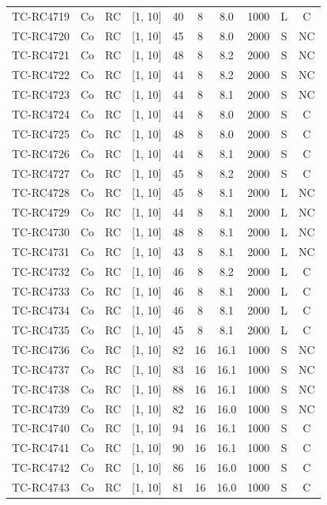 \begin{longtable}{lccccccccc}
TC-RC4719 & Co & RC & [1, 10] & 40 & 8 & 8.0 & 1000 & L & C \\
TC-RC4720 & Co & RC & [1, 10] & 45 & 8 & 8.0 & 2000 & S & NC \\
TC-RC4721 & Co & RC & [1, 10] & 48 & 8 & 8.2 & 2000 & S & NC \\
TC-RC4722 & Co & RC & [1, 10] & 44 & 8 & 8.2 & 2000 & S & NC \\
TC-RC4723 & Co & RC & [1, 10] & 44 & 8 & 8.1 & 2000 & S & NC \\
TC-RC4724 & Co & RC & [1, 10] & 44 & 8 & 8.0 & 2000 & S & C \\
TC-RC4725 & Co & RC & [1, 10] & 48 & 8 & 8.0 & 2000 & S & C \\
TC-RC4726 & Co & RC & [1, 10] & 44 & 8 & 8.1 & 2000 & S & C \\
TC-RC4727 & Co & RC & [1, 10] & 45 & 8 & 8.2 & 2000 & S & C \\
TC-RC4728 & Co & RC & [1, 10] & 45 & 8 & 8.1 & 2000 & L & NC \\
TC-RC4729 & Co & RC & [1, 10] & 44 & 8 & 8.1 & 2000 & L & NC \\
TC-RC4730 & Co & RC & [1, 10] & 48 & 8 & 8.1 & 2000 & L & NC \\
TC-RC4731 & Co & RC & [1, 10] & 43 & 8 & 8.1 & 2000 & L & NC \\
TC-RC4732 & Co & RC & [1, 10] & 46 & 8 & 8.2 & 2000 & L & C \\
TC-RC4733 & Co & RC & [1, 10] & 46 & 8 & 8.1 & 2000 & L & C \\
TC-RC4734 & Co & RC & [1, 10] & 46 & 8 & 8.1 & 2000 & L & C \\
TC-RC4735 & Co & RC & [1, 10] & 45 & 8 & 8.1 & 2000 & L & C \\
TC-RC4736 & Co & RC & [1, 10] & 82 & 16 & 16.1 & 1000 & S & NC \\
TC-RC4737 & Co & RC & [1, 10] & 83 & 16 & 16.1 & 1000 & S & NC \\
TC-RC4738 & Co & RC & [1, 10] & 88 & 16 & 16.1 & 1000 & S & NC \\
TC-RC4739 & Co & RC & [1, 10] & 82 & 16 & 16.0 & 1000 & S & NC \\
TC-RC4740 & Co & RC & [1, 10] & 94 & 16 & 16.1 & 1000 & S & C \\
TC-RC4741 & Co & RC & [1, 10] & 90 & 16 & 16.1 & 1000 & S & C \\
TC-RC4742 & Co & RC & [1, 10] & 86 & 16 & 16.0 & 1000 & S & C \\
TC-RC4743 & Co & RC & [1, 10] & 81 & 16 & 16.0 & 1000 & S & C \\

\end{longtable}
